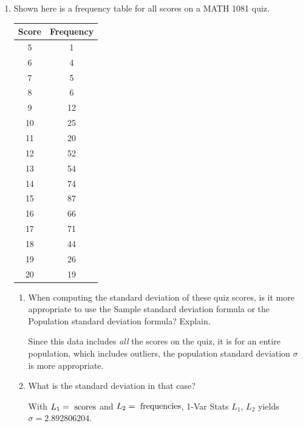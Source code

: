 \documentclass{article}
\newcommand{\answer}[1]{\color{white}#1}
\begin{document}
\pagestyle{myheadings}

\begin{center}
\textbf{}
\end{center}

\begin{enumerate}

\item Shown here is a frequency table for all scores on a MATH 1081 quiz.
\begin{center}
\begin{tabular}{c|c}
\hspace{1cm} Score \hspace{1cm} & \hspace{1cm} Frequency \hspace{1cm} \\
\hline
5 & 1 \\
6 & 4 \\
7 & 5 \\
8 & 6 \\
9 & 12 \\
10 & 25 \\
11 & 20 \\
12 & 52 \\
13 & 54 \\
14 & 74 \\
15 & 87 \\
16 & 66 \\
17 & 71 \\
18 & 44 \\
19 & 26 \\
20 & 19 \\
\end{tabular}
\end{center}
	\begin{enumerate}
	\item When computing the standard deviation of these quiz scores, is it more appropriate to use the Sample standard deviation formula or the Population standard deviation formula? Explain. 
	
	{\answer{Since this data includes {\em all} the scores on the quiz, it is for an entire population, which includes outliers, the population standard deviation $\sigma$ is more appropriate.}} 
	
	\item What is the standard deviation in that case? 
	
	{\answer{With $L_1 = \textnormal{ scores}$ and $L_2 = \textnormal{ frequencies}$, 
	1-Var Stats $L_1$, $L_2$ yields $\sigma = 2.892806204$.}} 


\end{enumerate}
\end{enumerate}
\end{document}
